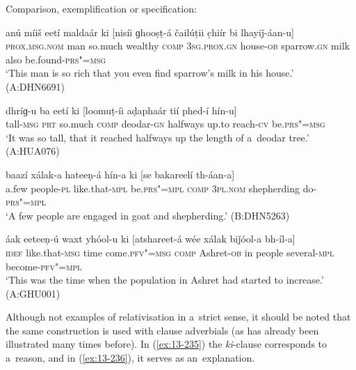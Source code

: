  Comparison, exemplification or specification:

\begin{exe}
\ex
\label{ex:13-231}
\gll anú míiš eetí maldaár ki [nisíi  ɡhooṣṭ-á čailúṭii c̣hiír bi lhayiǰ-áan-u] \\
\textsc{prox.msg.nom} man so.much wealthy \textsc{comp} \textsc{3sg.prox.gn }  house-\textsc{ob} sparrow.\textsc{gn} milk also be.found-\textsc{prs"=msg} \\
\glt `This man is so rich that you even find sparrow's milk in his house.' (A:DHN6691)

\ex
\label{ex:13-232}
\gll dhríɡ-u ba eetí ki [loomuṭ-íi aḍaphaár  tií phed-í hín-u] \\
tall-\textsc{msg} \textsc{prt} so.much \textsc{comp} deodar-\textsc{gn} halfways up.to reach-\textsc{cv} be.\textsc{prs"=msg} \\
\glt `It was so tall, that it reached halfways up the length of a~deodar tree.' (A:HUA076)

\ex
\label{ex:13-233}
\gll baazí xálak-a hateeṇ-á hín-a ki  [se bakareelí th-áan-a]  \\
a.few people-\textsc{pl}  like.that-\textsc{mpl} be.\textsc{prs"=mpl} \textsc{comp}  \textsc{3pl.nom}  shepherding do-\textsc{prs"=mpl} \\
\glt `A few people are engaged in goat and shepherding.' (B:DHN5263)

\ex
\label{ex:13-234}
\gll áak eeteeṇ-ú waxt yhóol-u ki  [atshareet-á wée xálak biǰóol-a bh-íl-a] \\
\textsc{idef} like.that-\textsc{msg} time come.\textsc{pfv"=msg} \textsc{comp} Ashret-\textsc{ob} in people several-\textsc{mpl} become-\textsc{pfv"=mpl} \\
\glt `This was the time when the population in Ashret had started to increase.' (A:GHU001) 
\end{exe}

Although not examples of relativisation in a~strict sense, it should be noted that the same construction is used with clause adverbials (as has already been illustrated many times before). In (\ref{ex:13-235}) the \textit{ki}-clause corresponds to a~reason, and in (\ref{ex:13-236}), it serves as an~explanation.

